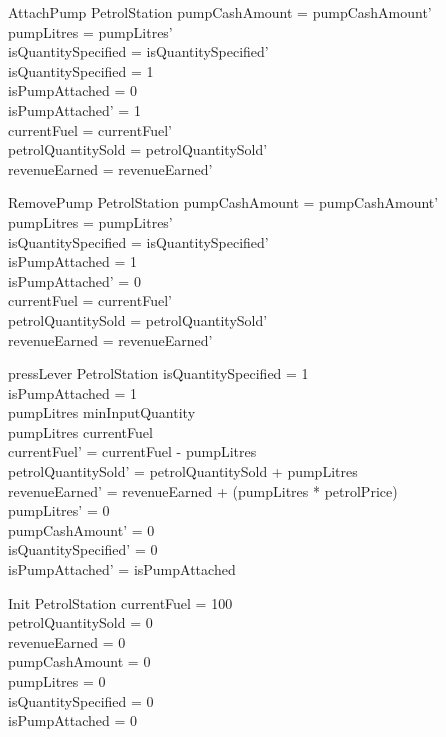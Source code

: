 \begin{schema}{AttachPump}
\Delta PetrolStation
\where
pumpCashAmount = pumpCashAmount' \\
pumpLitres = pumpLitres' \\
isQuantitySpecified = isQuantitySpecified' \\
isQuantitySpecified = 1 \\
isPumpAttached = 0 \\
isPumpAttached' = 1 \\
currentFuel = currentFuel' \\
petrolQuantitySold = petrolQuantitySold' \\
revenueEarned = revenueEarned'
\end{schema}

\begin{schema}{RemovePump}
\Delta PetrolStation
\where
pumpCashAmount = pumpCashAmount' \\
pumpLitres = pumpLitres' \\
isQuantitySpecified = isQuantitySpecified' \\
isPumpAttached = 1 \\
isPumpAttached' = 0 \\
currentFuel = currentFuel' \\
petrolQuantitySold = petrolQuantitySold' \\
revenueEarned = revenueEarned'
\end{schema}

\begin{schema}{pressLever}
\Delta PetrolStation
\where
isQuantitySpecified = 1 \\
isPumpAttached = 1 \\
pumpLitres \geq minInputQuantity \\
pumpLitres \leq currentFuel \\

currentFuel' = currentFuel - pumpLitres \\
petrolQuantitySold' = petrolQuantitySold + pumpLitres \\
revenueEarned' = revenueEarned + (pumpLitres * petrolPrice) \\
pumpLitres' = 0 \\
pumpCashAmount' = 0 \\
isQuantitySpecified' = 0 \\
isPumpAttached' = isPumpAttached
\end{schema}


\begin{schema}{Init}
PetrolStation
\where
currentFuel = 100 \\
petrolQuantitySold = 0 \\
revenueEarned = 0 \\
pumpCashAmount = 0 \\
pumpLitres = 0 \\
isQuantitySpecified = 0 \\
isPumpAttached = 0 \\
\end{schema}

